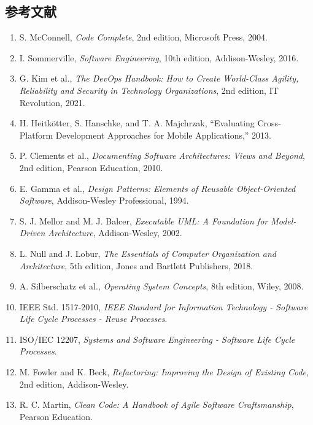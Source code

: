 \subsection{参考文献}

\begin{enumerate}
  \item S. McConnell, \textit{Code Complete}, 2nd edition, Microsoft Press, 2004.
  \item I. Sommerville, \textit{Software Engineering}, 10th edition, Addison-Wesley, 2016.
  \item G. Kim et al., \textit{The DevOps Handbook: How to Create World-Class Agility, Reliability and Security in Technology Organizations}, 2nd edition, IT Revolution, 2021.
  \item H. Heitkötter, S. Hanschke, and T. A. Majchrzak, ``Evaluating Cross-Platform Development Approaches for Mobile Applications,'' 2013.
  \item P. Clements et al., \textit{Documenting Software Architectures: Views and Beyond}, 2nd edition, Pearson Education, 2010.
  \item E. Gamma et al., \textit{Design Patterns: Elements of Reusable Object-Oriented Software}, Addison-Wesley Professional, 1994.
  \item S. J. Mellor and M. J. Balcer, \textit{Executable UML: A Foundation for Model-Driven Architecture}, Addison-Wesley, 2002.
  \item L. Null and J. Lobur, \textit{The Essentials of Computer Organization and Architecture}, 5th edition, Jones and Bartlett Publishers, 2018.
  \item A. Silberschatz et al., \textit{Operating System Concepts}, 8th edition, Wiley, 2008.
  \item IEEE Std. 1517-2010, \textit{IEEE Standard for Information Technology - Software Life Cycle Processes - Reuse Processes}.
  \item ISO/IEC 12207, \textit{Systems and Software Engineering - Software Life Cycle Processes}.
  \item M. Fowler and K. Beck, \textit{Refactoring: Improving the Design of Existing Code}, 2nd edition, Addison-Wesley.
  \item R. C. Martin, \textit{Clean Code: A Handbook of Agile Software Craftsmanship}, Pearson Education.
\end{enumerate}

